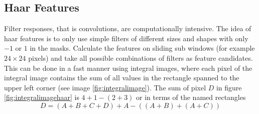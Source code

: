 \documentclass[11pt]{article}
\theoremstyle{definition}
\begin{document}
\subsection{Haar Features}
Filter responses, that is convolutions, are computationally intensive. The idea of haar features is to only use simple filters of different sizes and shapes with only $-1$ or $1$ in the masks. Calculate the features on sliding sub windows (for example $24\times24$ pixels) and take all possible combinations of filters as feature candidates. This can be done in a fast manner using integral images, where each pixel of the integral image contains the sum of all values in the rectangle spanned to the upper left corner (see image \ref{fig:integralimage}). The sum of pixel $D$ in figure \ref{fig:integralimagehaar} is $4 + 1 - (2 + 3)$ or in terms of the named rectangles
\begin{equation*}
	D = (A+B+C+D) + A - ((A+B) + (A+C))
\end{equation*}
\end{document}
